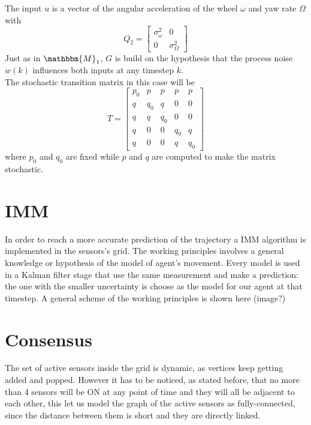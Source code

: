 \documentclass[twocolumn]{article}
\begin{document}
The input $u$ is a vector of the angular acceleration of the wheel $\omega$ and yaw rate $\Omega$ with
\begin{equation*}
    Q_{2}=\begin{bmatrix}
        \sigma^{2}_{\omega}&0\\
        0&\sigma^{2}_{\Omega}
    \end{bmatrix}
\end{equation*}
Just as in $\mathbbm{M}_{1}$, $G$ is build on the hypothesis that the process noise $w(k)$ influences both inputs at any timestep $k$.
\\
The stochastic transition matrix in this case will be 
\begin{equation*}
    T=\begin{bmatrix}
        p_{0}&p&p&p&p\\
        q&q_{0}&q&0&0\\
        q&q&q_{0}&0&0\\
        q&0&0&q_{0}&q\\
        q&0&0&q&q_{0}
    \end{bmatrix}
\end{equation*}
where $p_{0}$ and $q_{0}$ are fixed while $p$ and $q$ are computed to make the matrix stochastic.
\section*{IMM}
    In order to reach a more accurate prediction of the trajectory a IMM algorithm is implemented in the sensors's grid. The working principles 
    involves a general knowledge or hypothesis of the model of agent's movement. Every model is used in a Kalman filter stage that use the same measurement and make
    a prediction: the one with the smaller uncertainty is choose as the model for our agent at that timestep. A general scheme of the working principles is shown here (image?)
    \\

    \section*{Consensus}
    The set of active sensors inside the grid is dynamic, as vertices keep getting added and popped. However it has to be noticed, as stated before, that no 
     more than 4 sensors will be ON at any point of time and they will all be adjacent to each other, this let us model the graph of the active 
     sensors as fully-connected, since the distance between them is short and they are directly linked.
    \\
\end{document}
